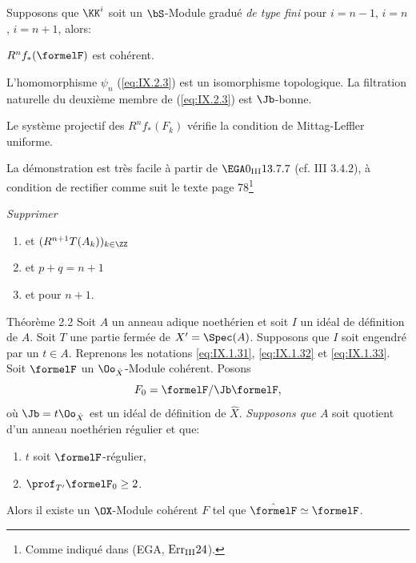 \begin{theoreme} \label{IX.2.1}
Supposons que $\KK^i$ soit un $\bS$-Module gradu\'e \emph{de type fini} pour $i=n-1$, $i=n$, $i=n+1$, alors:
\begin{enumeratei}
\item
$R^nf_*(\formelF)$ est coh\'erent.
\item
L'homomorphisme $\psi_n$ (\ref{eq:IX.2.3}) est un isomorphisme topologique. La filtration naturelle du deuxi\`eme membre de (\ref{eq:IX.2.3}) est ${\Jb}$-bonne.
\item
Le syst\`eme projectif des $R^nf_*(F_k)$ v\'erifie la condition de Mittag-Leffler uniforme.
\end{enumeratei}
\end{theoreme}

La d\'emonstration est tr\`es facile \`a partir de $\EGA 0_{\textup{III}} 13.7.7$ (cf. \EGA III $3.4.2$), \`a condition de rectifier comme suit le texte page 78\footnote{Comme indiqu\'e dans (EGA, $\rm{Err}_{\rm{III}}24$).}
\par
\emph{Supprimer}\begin{enumerate}
\item[ligne 6] \og et $(R^{n+1}T(A_k))_{k\in \ZZ}$\fg\
\item[ligne 13] \og et $p+q=n+1$\fg\
\item[ligne 23] \og et pour $n+1$\fg.
\end{enumerate}

\setcounter{equation}{7}
\label{IX.2.2}
\begin{enonce*}{Th\'eor\`eme 2.2\ndemark}
Soit $A$ un anneau adique noeth\'erien et soit $I$ un id\'eal de d\'efinition de $A$. Soit $T$ une partie ferm\'ee de $X'=\Spec(A)$. Supposons que $I$ soit engendr\'e par un $t \in A$. Reprenons les notations \ref{eq:IX.1.31}, \ref{eq:IX.1.32} et \ref{eq:IX.1.33}. Soit $\formelF$ un $\Oo_{\hat{X}}$-Module coh\'erent. Posons 
\begin{equation} \label{eq:IX.2.8}
F_0=\formelF / {\Jb} \formelF,
\end{equation}
o\`u ${\Jb}=t \Oo_{\hat{X}}$ est un id\'eal de d\'efinition de $\hat{X}$. \emph{Supposons que} $A$ soit quotient d'un anneau noeth\'erien r\'egulier et que:
\begin{enumerate}
\item
$t$ soit $\formelF$-r\'egulier,
\item
$\prof_{T'}\formelF_0\geq 2$.
\end{enumerate}
\noindent
Alors il existe un $\OX$-Module coh\'erent $F$ tel que $\hat{\formelF}\simeq \formelF$.
\end{enonce*}

